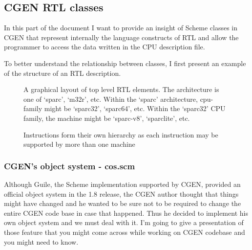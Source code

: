 \documentclass{article}
\begin{document}
\subsection{CGEN RTL classes}
In this part of the document I want to provide an insight of Scheme classes in CGEN that represent internally the language constructs of RTL and allow the programmer to access the data written in the CPU description file.

To better understand the relationship between classes, I first present an example of the structure of an RTL description.

\begin{figure}[H]
	\centering
	\caption{A graphical layout of top level RTL elements. The architecture is one of `sparc', `m32r', etc. Within the `sparc' architecture, cpu-family might be `sparc32', `sparc64', etc. Within the `sparc32' CPU family, the machine might be `sparc-v8', `sparclite', etc.}
\end{figure}

\begin{figure}[H]
	\centering
	\caption{Instructions form their own hierarchy as each instruction may be supported by more than one machine}
\end{figure}

\subsubsection{CGEN's object system - cos.scm}
Although Guile, the Scheme implementation supported by CGEN, provided an official object system in the 1.8 release, the CGEN author thought that things might have changed and he wanted to be sure not to be required to change the entire CGEN code base in case that happened. Thus he decided to implement his own object system and we must deal with it. I'm going to give a presentation of those feature that you might come across while working on CGEN codebase and you might need to know.
\end{document}

